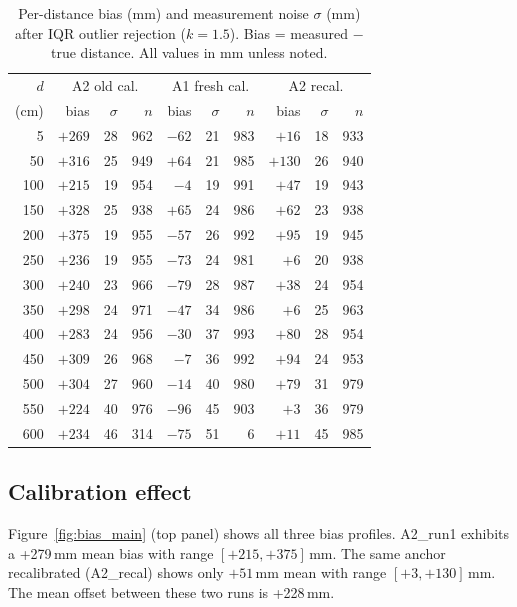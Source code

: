 \documentclass[10pt,a4paper,twocolumn]{article}
\begin{document}
\begin{table}[ht]
\centering
\caption{Per-distance bias (mm) and measurement noise $\sigma$ (mm) after
IQR outlier rejection ($k=1.5$). Bias = measured $-$ true distance. All values
in mm unless noted.}
\label{tab:bias_summary}
\small
\begin{tabular}{r|rrr|rrr|rrr}
\toprule
$d$ & \multicolumn{3}{c|}{A2 old cal.} & \multicolumn{3}{c|}{A1 fresh cal.} & \multicolumn{3}{c}{A2 recal.} \\
(cm) & bias & $\sigma$ & $n$ & bias & $\sigma$ & $n$ & bias & $\sigma$ & $n$ \\
\midrule
  5 & $+269$ & 28 & 962  & $-62$ & 21 &  983 & $+16$ & 18 &  933 \\
 50 & $+316$ & 25 & 949  & $+64$ & 21 &  985 & $+130$ & 26 &  940 \\
100 & $+215$ & 19 & 954  &  $-4$ & 19 &  991 & $+47$  & 19 &  943 \\
150 & $+328$ & 25 & 938  & $+65$ & 24 &  986 & $+62$  & 23 &  938 \\
200 & $+375$ & 19 & 955  & $-57$ & 26 &  992 & $+95$  & 19 &  945 \\
250 & $+236$ & 19 & 955  & $-73$ & 24 &  981 &  $+6$  & 20 &  938 \\
300 & $+240$ & 23 & 966  & $-79$ & 28 &  987 & $+38$  & 24 &  954 \\
350 & $+298$ & 24 & 971  & $-47$ & 34 &  986 &  $+6$  & 25 &  963 \\
400 & $+283$ & 24 & 956  & $-30$ & 37 &  993 & $+80$  & 28 &  954 \\
450 & $+309$ & 26 & 968  &  $-7$ & 36 &  992 & $+94$  & 24 &  953 \\
500 & $+304$ & 27 & 960  & $-14$ & 40 &  980 & $+79$  & 31 &  979 \\
550 & $+224$ & 40 & 976  & $-96$ & 45 &  903 &  $+3$  & 36 &  979 \\
600 & $+234$ & 46 & 314  & $-75$ & 51 &    6 & $+11$  & 45 &  985 \\
\bottomrule
\end{tabular}
\end{table}

\subsection{Calibration effect}
\label{sec:calibration}

Figure~\ref{fig:bias_main} (top panel) shows all three bias profiles.
A2\_run1 exhibits a +279\,mm mean bias with range
$[+215, +375]$\,mm.  The same anchor recalibrated (A2\_recal) shows only
$+51$\,mm mean with range $[+3, +130]$\,mm.  The mean offset between these
two runs is +228\,mm.
\end{document}
